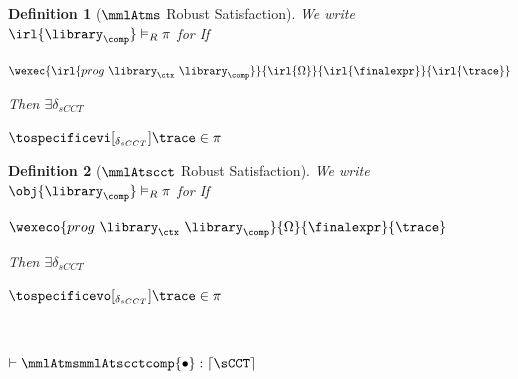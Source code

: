 \documentclass[a4paper,names,dvipsnames]{article}
\newtheorem{definition}{Definition}
\begin{document}
\begin{definition}[$\mmlAtms$ Robust Satisfaction]
  We write $\irl{\library_{\comp}}\vDash_{R}\pi$ for
  If
  \begin{assumptions}
    \item $\wexec{\irl{prog\ \library_{\ctx}\ \library_{\comp}}}{\irl{\Omega}}{\irl{\finalexpr}}{\irl{\trace}}$
  \end{assumptions}
  Then $\exists \delta_{sCCT}$
  \begin{goals}
    \item $\tospecificevi[_{\delta_{sCCT}}]{\trace}\in\pi$
  \end{goals}
\end{definition}

\begin{definition}[$\mmlAtscct$ Robust Satisfaction]
  We write $\obj{\library_{\comp}}\vDash_{R}\pi$ for
  If
  \begin{assumptions}
    \item $\wexeco{prog\ \library_{\ctx}\ \library_{\comp}}{\Omega}{\finalexpr}{\trace}$
  \end{assumptions}
  Then $\exists \delta_{sCCT}$
  \begin{goals}
    \item $\tospecificevo[_{\delta_{sCCT}}]{\trace}\in\pi$
  \end{goals}
\end{definition}

\begin{scontents}[store-env=buffer]
  $\;$\\
  \begin{goals}
    \item $\vdash\mmlAtmsmmlAtscctcomp{\bullet}:\lceil\operatorname{\sCCT}\rceil$
  \end{goals}
\end{scontents}
\begin{incompleteproof}
\end{incompleteproof}
\end{document}
